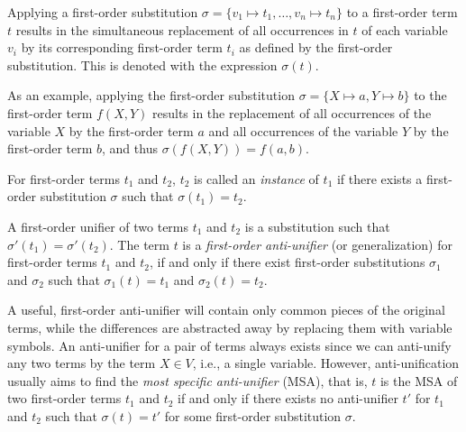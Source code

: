 \begin{defn}\label{def:substitution}
Applying a first-order substitution $\sigma = \{v_1 \mapsto t_1, \ldots, v_n \mapsto t_n\}$ to a first-order term $t$ results in the simultaneous replacement of all occurrences in $t$ of each variable $v_i$ by its corresponding first-order term $t_i$ as defined by the first-order substitution. This is denoted with the expression $\sigma(t)$.
\end{defn}

As an example, applying the first-order substitution $\sigma = \{X \mapsto a, Y \mapsto b\}$
to the first-order term $f(X,Y)$ results in the replacement of all occurrences of the variable $X$ by the first-order term $a$ and all occurrences of the variable $Y$ by the first-order term $b$, and thus $\sigma(f(X,Y)) = f(a,b)$.

\begin{defn}\label{def:instance}
For first-order terms $t_1$ and $t_2$, $t_2$ is called an \emph{instance} of $t_1$ if there exists a first-order substitution $\sigma$ such that $\sigma(t_1) = t_2$.
\end{defn}



\begin{defn}\label{def:generalization}
A first-order unifier of two terms $t_1$ and $t_2$ is a substitution such that $\sigma'(t_1)=\sigma'(t_2)$.  The term $t$ is a \emph{first-order anti-unifier} (or generalization) for first-order terms $t_1$ and $t_2$, if and only if there exist first-order substitutions $\sigma_1$ and $\sigma_2$ such that $\sigma_1(t)=t_1$ and $\sigma_2(t)=t_2$.
\end{defn}


A useful, first-order anti-unifier will contain only common pieces of the original terms, while the differences are abstracted away by replacing them with variable symbols. An anti-unifier for a pair of terms always exists since we can anti-unify any two terms by the term $X\in V$, i.e., a single variable. However, anti-unification usually aims to find the \emph{most specific anti-unifier} (MSA), that is, $t$ is the MSA of two first-order terms $t_1$ and $t_2$ if and only if there exists no anti-unifier $t'$ for $t_1$ and $t_2$ such that $\sigma(t)=t'$ for some first-order substitution $\sigma$.

